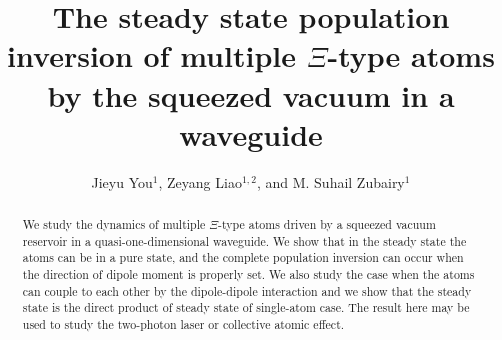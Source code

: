 \documentclass[aps,showpacs,twocolumn,twoside,groupedaddress]{revtex4}
\begin{document}
\title{The steady state population inversion of multiple $\Xi$-type atoms by the squeezed vacuum in a waveguide}
\author{Jieyu You$^{1}$, Zeyang Liao$^{1,2}$, and M. Suhail Zubairy$^{1}$}

\begin{abstract}
We study the dynamics of multiple $\Xi$-type atoms driven by a squeezed vacuum reservoir in a quasi-one-dimensional waveguide. We show that in the steady state the atoms can be in a pure state, and the complete population inversion can occur when the direction of dipole moment is properly set. We also study the case when the atoms can couple to each other by the dipole-dipole interaction and we show that the steady state is the direct product of steady state of single-atom case.  The result here may be used to study the two-photon laser or collective atomic effect.
\end{abstract}
\maketitle 
\end{document}

